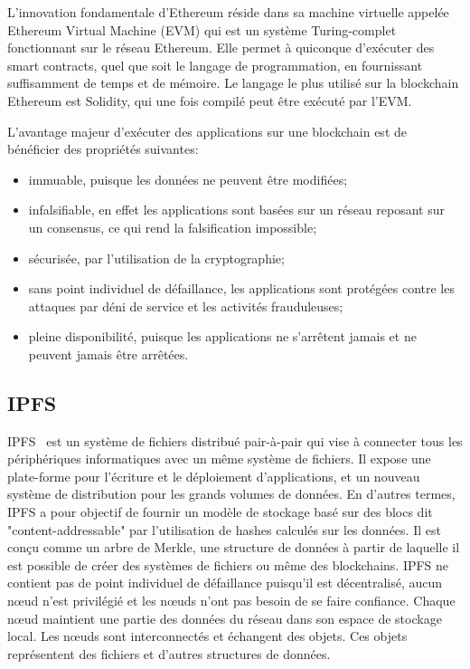 \documentclass{tnreport}
\begin{document}
L'innovation fondamentale d'Ethereum réside dans sa machine virtuelle appelée Ethereum Virtual Machine (EVM) qui est un système Turing-complet fonctionnant sur le réseau Ethereum. Elle permet à quiconque d'exécuter des smart contracts, quel que soit le langage de programmation, en fournissant suffisamment de temps et de mémoire. Le langage le plus utilisé sur la blockchain Ethereum est Solidity, qui une fois compilé peut être exécuté par l'EVM.

L'avantage majeur d'exécuter des applications sur une blockchain est de bénéficier des propriétés suivantes:
\begin{itemize}
	\item immuable, puisque les données ne peuvent être modifiées;
	\item infalsifiable, en effet les applications sont basées sur un réseau reposant sur un consensus, ce qui rend la falsification impossible;
	\item sécurisée, par l'utilisation de la cryptographie;
	\item sans point individuel de défaillance, les applications sont protégées contre les attaques par déni de service et les activités frauduleuses;
	\item pleine disponibilité, puisque les applications ne s'arrêtent jamais et ne peuvent jamais être arrêtées.
\end{itemize}

\subsection{IPFS}

IPFS~\cite{ipfs-paper} est un système de fichiers distribué pair-à-pair qui vise à connecter tous les périphériques informatiques avec un même système de fichiers. Il expose une plate-forme pour l'écriture et le déploiement d'applications, et un nouveau système de distribution pour les grands volumes de données. 
En d'autres termes, IPFS a pour objectif de fournir un modèle de stockage basé sur des blocs dit "content-addressable" par l'utilisation de hashes calculés sur les données. Il est conçu comme un arbre de Merkle, une structure de données à partir de laquelle il est possible de créer des systèmes de fichiers ou même des blockchains. IPFS ne contient pas de point individuel de défaillance puisqu'il est décentralisé, aucun nœud n'est privilégié et les nœuds n'ont pas besoin de se faire confiance. 
Chaque nœud maintient une partie des données du réseau dans son espace de stockage local. 
Les nœuds sont interconnectés et échangent des objets. Ces objets représentent des fichiers et d'autres structures de données.
\end{document}
